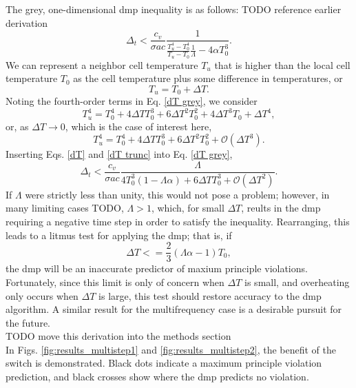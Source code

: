 The grey, one-dimensional \gls{dmp} inequality is as follows: TODO reference earlier derivation
\begin{equation}\label{dT grey}
\Delta_t<\frac{c_v}{\sigma a c}\frac{1}{\frac{T_u^4-T_0^4}{T_u-T_0}\frac{1}{\Lambda}-4\alpha T_0^3}.
\end{equation}
We can represent a neighbor cell temperature $T_u$ that is higher than the local cell temperature $T_0$ as the cell temperature plus some difference in temperatures, or
\begin{equation}\label{dT}
T_u=T_0+\Delta T.
\end{equation}
Noting the fourth-order terms in Eq. \ref{dT grey}, we consider
\begin{equation}
T_u^4=T_0^4+4\Delta TT_0^3+6\Delta T^2T_0^2+4\Delta T^3T_0 + \Delta T^4,
\end{equation}
or, as $\Delta T\to0$, which is the case of interest here, 
\begin{equation}\label{dT trunc}
T_u^4=T_0^4+4\Delta TT_0^3+6\Delta T^2T_0^2+\mathcal{O}(\Delta T^3).
\end{equation}
Inserting Eqs. \ref{dT} and \ref{dT trunc} into Eq. \ref{dT grey},
\begin{equation}
\Delta_t<\frac{c_v}{\sigma a c}\frac{\Lambda}{4T_0^3(1-\Lambda\alpha)+6\Delta TT_0^3 + \mathcal{O}(\Delta T^2)}.
\end{equation}
If $\Lambda$ were strictly less than unity, this would not pose a problem; however, in many limiting cases TODO, $\Lambda>1$, which, for small $\Delta T$, reults in the \gls{dmp} requiring a negative time step in order to satisfy the inequality.  Rearranging, this leads to a litmus test for applying the \gls{dmp}; that is, if
\begin{equation}
\Delta T<=\frac{2}{3}(\Lambda\alpha-1)T_0,
\end{equation}
the \gls{dmp} will be an inaccurate predictor of maxium principle violations.  Fortunately, since this limit is only of concern when $\Delta T$ is small, and overheating only occurs when $\Delta T$ is large, this test should restore accuracy to the \gls{dmp} algorithm.  A similar result for the multifrequency case is a desirable pursuit for the future. \\
TODO move this derivation into the methods section\\
In Figs. \ref{fig:results_multistep1} and \ref{fig:results_multistep2}, the benefit of the switch is demonstrated.  Black dots indicate a maximum principle violation prediction, and black crosses show where the \gls{dmp} predicts no violation.

